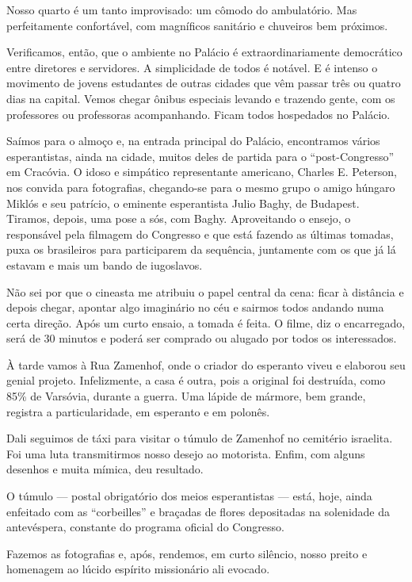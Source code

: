 Nosso quarto é um tanto improvisado: um cômodo do ambulatório. Mas perfeitamente confortável, com magníficos sanitário e chuveiros bem próximos.

Verificamos, então, que o ambiente no Palácio é extraordinariamente democrático entre diretores e servidores. A simplicidade de todos é notável. E é intenso o movimento de jovens estudantes de outras cidades que vêm passar três ou quatro dias na capital. Vemos chegar ônibus especiais levando e trazendo gente, com os professores ou professoras acompanhando. Ficam todos hospedados no Palácio.

Saímos para o almoço e, na entrada principal do Palácio, encontramos vários esperantistas, ainda na cidade, muitos deles de partida para o ``post-Congresso'' em Cracóvia. O idoso e simpático representante americano, Charles E. Peterson, nos convida para fotografias, chegando-se para o mesmo grupo o amigo húngaro Miklós e seu patrício, o eminente esperantista Julio Baghy, de Budapest. Tiramos, depois, uma pose a sós, com Baghy. Aproveitando o ensejo, o responsável pela filmagem do Congresso e que está fazendo as últimas tomadas, puxa os brasileiros para participarem da sequência, juntamente com os que já lá estavam e mais um bando de iugoslavos.

Não sei por que o cineasta me atribuiu o papel central da cena: ficar à distância e depois chegar, apontar algo imaginário no céu e sairmos todos andando numa certa direção. Após um curto ensaio, a tomada é feita. O filme, diz o encarregado, será de 30 minutos e poderá ser comprado ou alugado por todos os interessados.

À tarde vamos à Rua Zamenhof, onde o criador do esperanto viveu e elaborou seu genial projeto. Infelizmente, a casa é outra, pois a original foi destruída, como 85\% de Varsóvia, durante a guerra. Uma lápide de mármore, bem grande, registra a particularidade, em esperanto e em polonês.

Dali seguimos de táxi para visitar o túmulo de Zamenhof no cemitério israelita. Foi uma luta transmitirmos nosso desejo ao motorista. Enfim, com alguns desenhos e muita mímica, deu resultado.

O túmulo --- postal obrigatório dos meios esperantistas --- está, hoje, ainda enfeitado com as ``corbeilles'' e braçadas de flores depositadas na solenidade da antevéspera, constante do programa oficial do Congresso.

Fazemos as fotografias e, após, rendemos, em curto silêncio, nosso preito e homenagem ao lúcido espírito missionário ali evocado.

